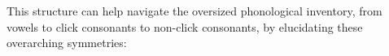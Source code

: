 \documentclass[11pt,a5paper]{book}
\begin{document}
This structure can help navigate the oversized phonological inventory, from vowels to click consonants to non-click consonants, by elucidating these overarching symmetries:

\end{document}
